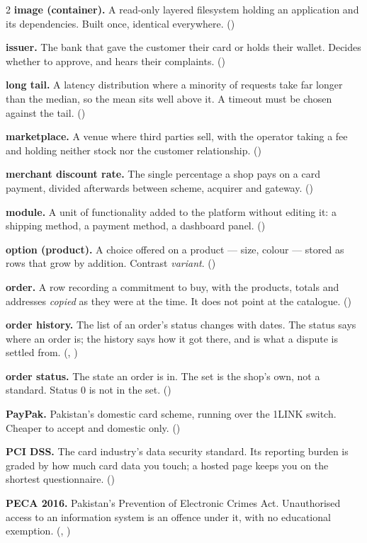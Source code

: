 \begin{multicols}{2}
\textbf{image (container).} A read-only layered filesystem holding an
application and its dependencies. Built once, identical everywhere.
()

\textbf{issuer.} The bank that gave the customer their card or holds their
wallet. Decides whether to approve, and hears their complaints.
()

\textbf{long tail.} A latency distribution where a minority of requests take
far longer than the median, so the mean sits well above it. A timeout must be
chosen against the tail. ()

\textbf{marketplace.} A venue where third parties sell, with the operator
taking a fee and holding neither stock nor the customer relationship.
()

\textbf{merchant discount rate.} The single percentage a shop pays on a card
payment, divided afterwards between scheme, acquirer and gateway.
()

\textbf{module.} A unit of functionality added to the platform without editing
it: a shipping method, a payment method, a dashboard panel.
()

\textbf{option (product).} A choice offered on a product --- size, colour ---
stored as rows that grow by addition. Contrast \emph{variant}.
()

\textbf{order.} A row recording a commitment to buy, with the products,
totals and addresses \emph{copied} as they were at the time. It does not point
at the catalogue. ()

\textbf{order history.} The list of an order's status changes with dates. The
status says where an order is; the history says how it got there, and is what
a dispute is settled from. (, )

\textbf{order status.} The state an order is in. The set is the shop's own, not
a standard. Status 0 is not in the set. ()

\textbf{PayPak.} Pakistan's domestic card scheme, running over the 1LINK
switch. Cheaper to accept and domestic only. ()

\textbf{PCI DSS.} The card industry's data security standard. Its reporting
burden is graded by how much card data you touch; a hosted page keeps you on
the shortest questionnaire. ()

\textbf{PECA 2016.} Pakistan's Prevention of Electronic Crimes Act.
Unauthorised access to an information system is an offence under it, with no
educational exemption. (, )


\end{multicols}

